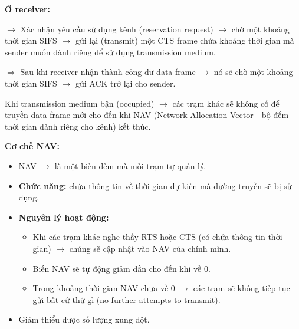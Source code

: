\vspace{0.3cm}

\noindent
\textbf{Ở receiver:}
\medskip

\noindent
$\rightarrow$ Xác nhận yêu cầu sử dụng kênh (reservation request) $\rightarrow$ chờ một khoảng thời gian SIFS $\rightarrow$ gửi lại (transmit) một CTS frame chứa khoảng thời gian mà sender muốn dành riêng để sử dụng transmission medium.
\medskip

\vspace{0.3cm}

\noindent
$\Rightarrow$ Sau khi receiver nhận thành công dữ data frame $\rightarrow$ nó sẽ chờ một khoảng thời gian SIFS $\rightarrow$ gửi ACK trở lại cho sender.
\medskip

\vspace{0.3cm}

\noindent
Khi transmission medium bận (occupied) $\rightarrow$ các trạm khác sẽ không cố để truyền data frame mới cho đến khi NAV (Network Allocation Vector - bộ đếm thời gian dành riêng cho kênh) kết thúc.
\medskip

\vspace{0.3cm}

\noindent
\textbf{Cơ chế NAV:}

\begin{itemize}
    \item NAV $\rightarrow$ là một biến đếm mà mỗi trạm tự quản lý.
    \item \textbf{Chức năng:} chứa thông tin về thời gian dự kiến mà đường truyền sẽ bị sử dụng.
    \item \textbf{Nguyên lý hoạt động:} \begin{itemize}
        \item Khi các trạm khác nghe thấy RTS hoặc CTS (có chứa thông tin thời gian) $\rightarrow$ chúng sẽ cập nhật vào NAV của chính mình.
        \item Biến NAV sẽ tự động giảm dần cho đến khi về 0.
        \item Trong khoảng thời gian NAV chưa về 0 $\rightarrow$ các trạm sẽ không tiếp tục gửi bất cứ thứ gì (no further attempts to transmit).
    \end{itemize}
    \item[$\Rightarrow$] Giảm thiểu được số lượng xung đột.
\end{itemize}
\medskip

